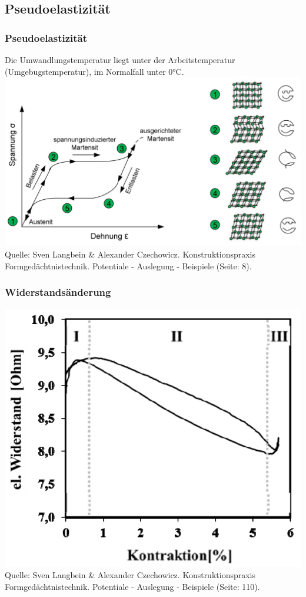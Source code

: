 \subsection{Pseudoelastizität}
\begin{frame}[c]\frametitle{Pseudoelastizität}
	Die Umwandlungstemperatur liegt unter der Arbeitstemperatur
	(Umgebugstemperatur), im Normalfall unter 0°C.\\
	\centering
	\includegraphics[height=0.5\textwidth]{medien/Verhalten_beim_pseudoelastischen_Effekt.png}
	\\
	\tiny{Quelle: Sven Langbein \& Alexander Czechowicz. Konstruktionspraxis
	Formgedächtnistechnik. Potentiale - Auslegung - Beispiele (Seite: 8).}
\end{frame}

\begin{frame}[c]\frametitle{Widerstandsänderung}
	\centering
	\includegraphics[height=0.5\textwidth]{medien/widerstand_zu_kontraktion.png}
	\\
	\tiny{Quelle: Sven Langbein \& Alexander Czechowicz. Konstruktionspraxis
	Formgedächtnistechnik. Potentiale - Auslegung - Beispiele (Seite: 110).}
\end{frame}

